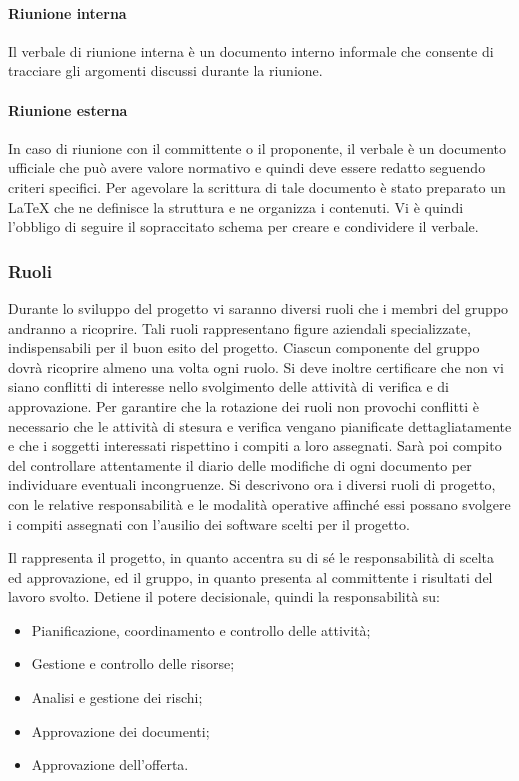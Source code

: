 \documentclass[12pt,a4paper]{article}
\begin{document}
\paragraph{Riunione interna}
Il verbale di riunione interna è un documento interno informale che consente di tracciare gli argomenti discussi durante la riunione.

\paragraph{Riunione esterna}
In caso di riunione con il committente o il proponente, il verbale è un documento ufficiale che può avere valore normativo e quindi deve essere redatto seguendo criteri specifici.
Per agevolare la scrittura di tale documento è stato preparato un  \LaTeX{} che ne definisce la struttura e ne organizza i contenuti. Vi è quindi l'obbligo di seguire il sopraccitato schema per creare e condividere il verbale.

\subsubsection{Ruoli}\label{Ruoli}
Durante lo sviluppo del progetto vi saranno diversi ruoli che i membri del gruppo andranno a ricoprire. Tali ruoli rappresentano figure aziendali specializzate, indispensabili per il buon esito del progetto. Ciascun componente del gruppo dovrà ricoprire almeno una volta ogni ruolo. Si deve inoltre certificare che non vi siano conflitti di interesse nello svolgimento delle attività di verifica e di approvazione.
Per garantire che la rotazione dei ruoli non provochi conflitti è necessario che le attività di stesura e verifica vengano pianificate dettagliatamente e che i soggetti interessati rispettino i compiti a loro assegnati. Sarà poi compito del \VR{} controllare attentamente il diario delle modifiche di ogni documento per individuare eventuali incongruenze.
Si descrivono ora i diversi ruoli di progetto, con le relative responsabilità e le modalità operative affinché essi possano svolgere i compiti assegnati con l'ausilio dei software scelti per il progetto.

Il \PM{} rappresenta il progetto, in quanto accentra su di sé le responsabilità di scelta ed approvazione, ed il gruppo, in quanto presenta al committente i risultati del lavoro svolto.
Detiene il potere decisionale, quindi la responsabilità su:
\begin{itemize}
	\item Pianificazione, coordinamento e controllo delle attività;
	\item Gestione e controllo delle risorse;
	\item Analisi e gestione dei rischi;
	\item Approvazione dei documenti;
	\item Approvazione dell'offerta.
\end{itemize}
\end{document}
